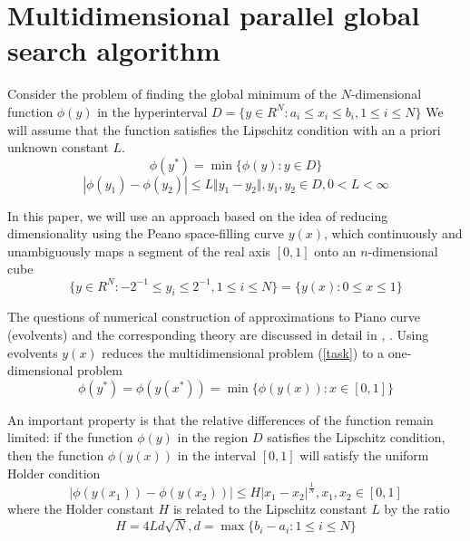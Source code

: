 \documentclass{svproc}
\begin{document}
\section{Multidimensional parallel global search algorithm}
Consider the problem of finding the global minimum of the \(N\)-dimensional function \(\phi(y)\) in the hyperinterval  \(D=\{y\in R^N:a_i\leqslant x_i\leqslant{b_i}, 1\leqslant{i}\leqslant{N}\}\)  We will assume that the function satisfies the Lipschitz condition with an a priori unknown constant \(L\).
\begin{equation}
\label{task}
\phi(y^*)=\min\{\phi(y):y\in D\}
\end{equation}
\begin{equation}
\label{lip}
|\phi(y_1)-\phi(y_2)|\leqslant L\Vert y_1-y_2\Vert,y_1,y_2\in D,0<L<\infty
\end{equation}

In this paper, we will use an approach based on the idea of reducing dimensionality using the Peano space-filling curve \(y(x)\), which continuously and unambiguously maps a segment of the real axis \([0,1]\) onto an \(n\)-dimensional cube
\begin{equation}
\label{cube}
\lbrace y\in R^N:-2^{-1}\leqslant y_i\leqslant 2^{-1},1\leqslant i\leqslant N\rbrace=\{y(x):0\leqslant x\leqslant 1\}
\end{equation}

The questions of numerical construction of approximations to Piano curve (evolvents) and the corresponding theory are discussed in detail in \cite{Ref9}, \cite{Ref10}. Using evolvents \(y(x)\) reduces the multidimensional problem (\ref{task}) to a one-dimensional problem
\begin{displaymath}
\label{oneDimTask}
\phi(y^*)=\phi(y(x^*))=\min\{\phi(y(x)):x\in [0,1]\}
\end{displaymath}

An important property is that the relative differences of the function remain limited: if the function \(\phi(y)\) in the region \(D
\) satisfies the Lipschitz condition, then the function \(\phi(y(x))\) in the interval \([0,1]\) will satisfy the uniform Holder condition
\begin{displaymath}
\label{holder}
|\phi(y(x_1))-\phi(y(x_2))|\leqslant H{|x_1-x_2|}^{\frac{1}{N}},x_1,x_2\in[0,1]
\end{displaymath}
where the Holder constant \(H\) is related to the Lipschitz constant \(L\) by the ratio
\begin{displaymath}
H=4Ld\sqrt{N},d=\max\{b_i-a_i:1\leqslant i\leqslant N\}
\end{displaymath}
\end{document}
